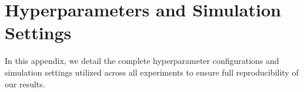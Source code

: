 \documentclass{article}
\theoremstyle{plain}
\theoremstyle{definition}
\theoremstyle{remark}
\begin{document}







\newpage



\newpage
\appendix
\onecolumn
\section{Hyperparameters and Simulation Settings}
\label{sec:appendix}

In this appendix, we detail the complete hyperparameter configurations and simulation settings utilized across all experiments to ensure full reproducibility of our results.
\end{document}
